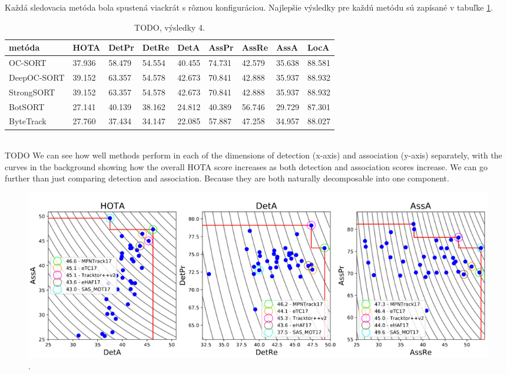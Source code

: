 Každá sledovacia metóda bola spustená viackrát s rôznou konfiguráciou. Najlepšie výsledky pre každú metódu sú zapísané v tabuľke \ref{table:hota1}.
\\
\begin{table}[ht]
\centering
\begin{tabular}{|l l l l l l l l l|}
 \hline
metóda & HOTA & DetPr & DetRe & DetA & AssPr & AssRe & AssA & LocA \\ [0.5ex]
 \hline
OC-SORT & 37.936 & 58.479 & 54.554 & 40.455 & 74.731 & 42.579 & 35.638 & 88.581 \\ [0.1ex]
DeepOC-SORT & 39.152 & 63.357 & 54.578 & 42.673 & 70.841 & 42.888 & 35.937 & 88.932 \\ [0.1ex]
StrongSORT & 39.152 & 63.357 & 54.578 & 42.673 & 70.841 & 42.888 & 35.937 & 88.932 \\ [0.1ex]
BotSORT & 27.141 & 40.139 & 38.162 & 24.812 & 40.389 & 56.746 & 29.729 & 87.301 \\ [0.1ex]
ByteTrack & 27.760 & 37.434 & 34.147 & 22.085 & 57.887 & 47.258 & 34.957 & 88.027 \\ [0.1ex]
 \hline
\end{tabular}
\caption{TODO, výsledky 4.}
\label{table:hota1}
\end{table}
\\
TODO We can see how well methods perform in each of the dimensions of detection (x-axis) and association (y-axis) separately, with the curves in the background showing how the overall HOTA score increases as both detection and association scores increase. We can go further than just comparing detection and association. Because they are both naturally decomposable into one component.
\begin{figure}[ht]
    \centering
    \includegraphics[width=1\textwidth]{images/05/compare.png}
    \caption{.}
    \label{img:road}
\end{figure}

